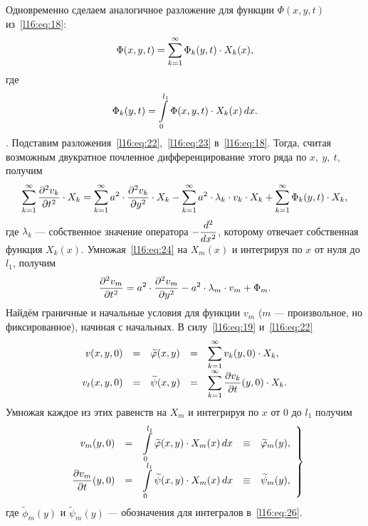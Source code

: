 Одновременно сделаем аналогичное разложение для функции $\Phi(x,y,t)$ из~\eqref{l16:eq:18}:
\begin{equation}\label{l16:eq:23}
	\hfill\Phi(x,y,t)=\sum\limits_{k=1}^{\infty}\Phi_k(y,t)\cdot X_k(x),\hfill
\end{equation}
где 
\begin{equation*}
	\hfill\Phi_k(y,t)=\int\limits_0^{l_1}\Phi(x,y,t)\cdot X_k(x)\,dx.\hfill
\end{equation*}.
Подставим разложения~\eqref{l16:eq:22},~\eqref{l16:eq:23} в~\eqref{l16:eq:18}. Тогда, считая возможным двукратное почленное дифференцирование этого ряда по $x,\ y,\ t$, получим 
\begin{equation}\label{l16:eq:24}
	\sum\limits_{k=1}^{\infty}\frac{\partial^2v_k}{\partial t^2}\cdot X_k=\sum\limits_{k=1}^{\infty}a^2\cdot\frac{\partial^2v_k}{\partial y^2}\cdot X_k-\sum\limits_{k=1}^{\infty}a^2\cdot\lambda_k\cdot v_k\cdot X_k+\sum\limits_{k=1}^{\infty}\Phi_k(y,t)\cdot X_k,
\end{equation}
где $\lambda_k$ --- собственное значение оператора $-\displaystyle\frac{d^2}{dx^2}$, которому отвечает собственная функция $X_k(x)$. Умножая~\eqref{l16:eq:24} на $X_m(x)$ и интегрируя по $x$ от нуля до $l_1$, получим
\begin{equation}\label{l16:eq:25}
	\hfill\pdder{v_m}{t}=a^2\cdot\pdder{v_m}{y}-a^2\cdot\lambda_m\cdot v_m+\Phi_m.\hfill
\end{equation} 
Найдём граничные и начальные условия для функции $v_m$ ($m$ --- произвольное, но фиксированное), начиная с начальных. В силу~\eqref{l16:eq:19} и~\eqref{l16:eq:22} 
\begin{equation*}
	\hfill\begin{array}{rcccl}
		v(x,y,0)&=&\widetilde{\phi}(x,y)&=&\displaystyle\sum\limits_{k=1}^{\infty}v_k(y,0)\cdot X_k,\\
		v_t(x,y,0)&=&\widetilde{\psi}(x,y)&=&\displaystyle\sum\limits_{k=1}^{\infty}\pder{v_k}{t}(y,0)\cdot X_k.
	\end{array}\hfill
\end{equation*}
Умножая каждое из этих равенств на $X_m$ и интегрируя по $x$ от $0$ до $l_1$ получим 
\begin{equation}\label{l16:eq:26}
	\hfill\left.\begin{array}{rcccl}
		v_m(y,0)&=&\displaystyle\int\limits_0^{l_1}\widetilde{\phi}(x,y)\cdot X_m(x)\,dx& \equiv& \widetilde{\phi}_m(y),\\
		\displaystyle\pder{v_m}{t}(y,0)&=&\displaystyle\int\limits_0^{l_1}\widetilde{\psi}(x,y)\cdot X_m(x)\,dx&\equiv&\widetilde{\psi}_m(y),
	\end{array}\right\}\hfill
\end{equation}
где $\widetilde{\phi}_m(y)$ и $\widetilde{\psi}_m(y)$ --- обозначения для интегралов в~\eqref{l16:eq:26}.


